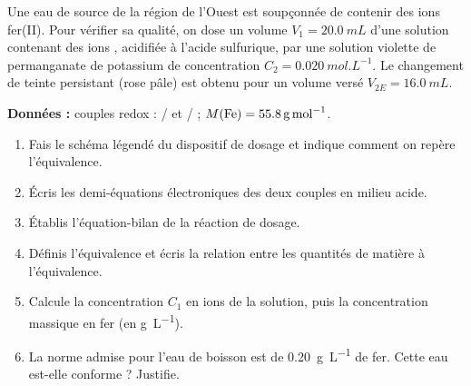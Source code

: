 \documentclass[11pt]{article}
\begin{document}
\begin{exercice}
Une eau de source de la région de l'Ouest est soupçonnée de contenir des ions fer(II). Pour vérifier sa qualité, on dose un volume $V_1 = \SI{20,0}{mL}$ d'une solution contenant des ions , acidifiée à l'acide sulfurique, par une solution violette de permanganate de potassium de concentration $C_2 = \SI{0,020}{mol.L^{-1}}$. Le changement de teinte persistant (rose pâle) est obtenu pour un volume versé $V_{2E} = \SI{16,0}{mL}$.

\textbf{Données :} couples redox : / et / ; $M(\ce{Fe}) = \SI{55,8}{g.mol^{-1}}$.

\begin{enumerate}
\item Fais le schéma légendé du dispositif de dosage et indique comment on repère l'équivalence.
\item Écris les demi-équations électroniques des deux couples en milieu acide.
\item Établis l'équation-bilan de la réaction de dosage.
\item Définis l'équivalence et écris la relation entre les quantités de matière à l'équivalence.
\item Calcule la concentration $C_1$ en ions  de la solution, puis la concentration massique en fer (en \si{g.L^{-1}}).
\item La norme admise pour l'eau de boisson est de \SI{0,20}{g.L^{-1}} de fer. Cette eau est-elle conforme ? Justifie.
\end{enumerate}
\end{exercice}
\end{document}
